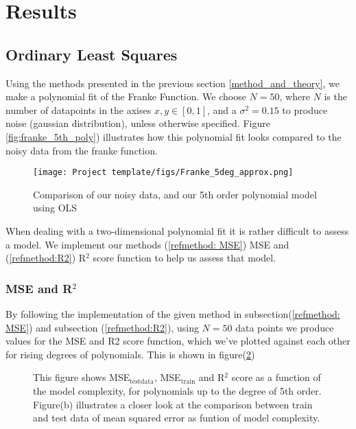 \documentclass[../main.tex]{subfiles}
\begin{document}
\newpage
\section{Results}
\subsection{Ordinary Least Squares}

Using the methods presented in the previous section \ref{method_and_theory}, we make a polynomial fit of the Franke Function. We choose $N = 50$, where $N$ is the number of datapoints in the axises $x,y \in [0,1]$, and a $\sigma^2=0.15$ to produce noise (gaussian distribution), unless otherwise specified. Figure \eqref{fig:franke_5th_poly}) illustrates how this polynomial fit looks compared to the noisy data from the franke function.
\begin{figure}[h!]
    \centering
    \texttt{[image: Project template/figs/Franke\_5deg\_approx.png]}
    \caption{Comparison of our noisy data, and our 5th order polynomial model using OLS}
    \label{fig:franke_5th_poly}
\end{figure}
\vskip0.1in
\begin{flushleft}
When dealing with a two-dimensional polynomial fit it is rather difficult to assess a model. We implement our methods (\ref{refmethod: MSE}) MSE and (\ref{refmethod:R2}) R$^2$ score function to help us assess that model.
\end{flushleft}

\newpage
\subsubsection{MSE and R$^2$}
By following the implementation of the given method in subsection(\ref{refmethod: MSE}) and subsection (\ref{refmethod:R2}),  using $N = 50$ data points we produce values for the MSE and R2 score function, which we've plotted against each other for rising degrees of polynomials. This is shown in figure(\ref{fig:MSE_MSEtrain_R2_score})
\begin{figure}[H]
\hspace*{-1in}

\caption{This figure shows MSE$_\text{testdata}$, MSE$_\text{train}$ and R$^2$ score as a function of the model complexity, for polynomials up to the degree of 5th order. Figure(b) illustrates a closer look at the comparison between train and test data of mean squared error as funtion of model complexity.}
\label{fig:MSE_MSEtrain_R2_score}
\end{figure}
\end{document}
